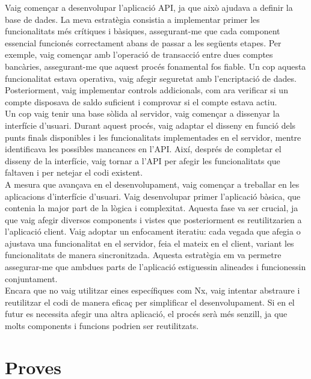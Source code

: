 \documentclass[a4paper,12pt,twoside]{ThesisStyle}
\begin{document}
Vaig començar a desenvolupar l'aplicació API, ja que això ajudava a definir la base de dades. La meva estratègia consistia a implementar primer les funcionalitats més crítiques i bàsiques, assegurant-me que cada component essencial funcionés correctament abans de passar a les següents etapes. Per exemple, vaig començar amb l'operació de transacció entre dues comptes bancàries, assegurant-me que aquest procés fonamental fos fiable. Un cop aquesta funcionalitat estava operativa, vaig afegir seguretat amb l'encriptació de dades. Posteriorment, vaig implementar controls addicionals, com ara verificar si un compte disposava de saldo suficient i comprovar si el compte estava actiu.\\

Un cop vaig tenir una base sòlida al servidor, vaig començar a dissenyar la interfície d'usuari. Durant aquest procés, vaig adaptar el disseny en funció dels punts finals disponibles i les funcionalitats implementades en el servidor, mentre identificava les possibles mancances en l'API. Així, després de completar el disseny de la interfície, vaig tornar a l'API per afegir les funcionalitats que faltaven i per netejar el codi existent.\\

A mesura que avançava en el desenvolupament, vaig començar a treballar en les aplicacions d'interfície d'usuari. Vaig desenvolupar primer l'aplicació bàsica, que contenia la major part de la lògica i complexitat. Aquesta fase va ser crucial, ja que vaig afegir diversos components i vistes que posteriorment es reutilitzarien a l'aplicació client. Vaig adoptar un enfocament iteratiu: cada vegada que afegia o ajustava una funcionalitat en el servidor, feia el mateix en el client, variant les funcionalitats de manera sincronitzada. Aquesta estratègia em va permetre assegurar-me que ambdues parts de l'aplicació estiguessin alineades i funcionessin conjuntament.\\

Encara que no vaig utilitzar eines específiques com Nx, vaig intentar abstraure i reutilitzar el codi de manera eficaç per simplificar el desenvolupament. Si en el futur es necessita afegir una altra aplicació, el procés serà més senzill, ja que molts components i funcions podrien ser reutilitzats.




\section{Proves}
\label{sec: Proves}
\end{document}
